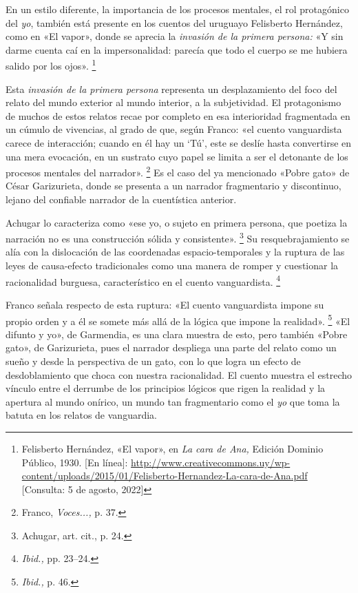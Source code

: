 \documentclass[14pt,twoside,final]{extbook} %
\let\oldfootnote\footnote
\renewcommand\footnote[1]{%
\oldfootnote{\hspace{1mm}#1}}
\begin{document}
En un estilo diferente, la importancia de los procesos mentales, el rol protagónico del \emph{yo}, también está presente en los cuentos del uruguayo Felisberto Hernández, como en «El vapor», donde se aprecia la \emph{invasión de la primera persona:} «Y sin darme cuenta caí en la impersonalidad: parecía que todo el cuerpo se me hubiera salido por los ojos».\footnote{Felisberto Hernández, «El vapor», en \emph{La cara de Ana,} Edición Dominio Público, 1930. [En línea]: \url{http://www.creativecommons.uy/wp-content/uploads/2015/01/Felisberto-Hernandez-La-cara-de-Ana.pdf} [Consulta: 5 de agosto, 2022]}

Esta \emph{invasión de la primera persona} representa un desplazamiento del foco del relato del mundo exterior al mundo interior, a la subjetividad. El protagonismo de muchos de estos relatos recae por completo en esa interioridad fragmentada en un cúmulo de vivencias, al grado de que, según Franco: «el cuento vanguardista carece de interacción; cuando en él hay un `Tú', este se deslíe hasta convertirse en una mera evocación, en un sustrato cuyo papel se limita a ser el detonante de los procesos mentales del narrador».\footnote{Franco, \emph{Voces...,} p. 37.} Es el caso del ya mencionado «Pobre gato» de César Garizurieta, donde se presenta a un narrador fragmentario y discontinuo, lejano del confiable narrador de la cuentística anterior.

Achugar lo caracteriza como «ese yo, o sujeto en primera persona, que poetiza la narración no es una construcción sólida y consistente».\footnote{Achugar, art. cit., p. 24.} Su resquebrajamiento se alía con la dislocación de las coordenadas espacio-temporales y la ruptura de las leyes de causa-efecto tradicionales como una manera de romper y cuestionar la racionalidad burguesa, característico en el cuento vanguardista.\footnote{\emph{Ibid.,} pp. 23--24.}

Franco señala respecto de esta ruptura: «El cuento vanguardista impone su propio orden y a él se somete más allá de la lógica que impone la realidad».\footnote{\emph{Ibid.,} p. 46.} «El difunto y yo», de Garmendia, es una clara muestra de esto, pero también «Pobre gato», de Garizurieta, pues el narrador despliega una parte del relato como un sueño y desde la perspectiva de un gato, con lo que logra un efecto de desdoblamiento que choca con nuestra racionalidad. El cuento muestra el estrecho vínculo entre el derrumbe de los principios lógicos que rigen la realidad y la apertura al mundo onírico, un mundo tan fragmentario como el \emph{yo} que toma la batuta en los relatos de vanguardia.
\end{document}
